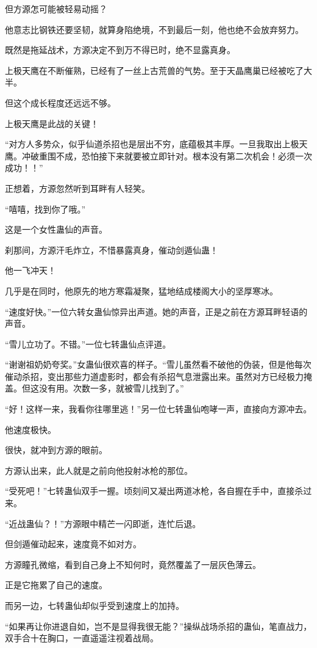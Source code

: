 \begin{this_body}
但方源怎可能被轻易动摇？

他意志比钢铁还要坚韧，就算身陷绝境，不到最后一刻，他也绝不会放弃努力。

既然是拖延战术，方源决定不到万不得已时，绝不显露真身。

上极天鹰在不断催熟，已经有了一丝上古荒兽的气势。至于天晶鹰巢已经被吃了大半。

但这个成长程度还远远不够。

上极天鹰是此战的关键！

“对方人多势众，似乎仙道杀招也是层出不穷，底蕴极其丰厚。一旦我取出上极天鹰。冲破重围不成，恐怕接下来就要被立即针对。根本没有第二次机会！必须一次成功！！”

正想着，方源忽然听到耳畔有人轻笑。

“嘻嘻，找到你了哦。”

这是一个女性蛊仙的声音。

刹那间，方源汗毛炸立，不惜暴露真身，催动剑遁仙蛊！

他一飞冲天！

几乎是在同时，他原先的地方寒霜凝聚，猛地结成楼阁大小的坚厚寒冰。

“速度好快。”一位六转女蛊仙惊异出声道。她的声音，正是之前在方源耳畔轻语的声音。

“雪儿立功了。不错。”一位七转蛊仙点评道。

“谢谢祖奶奶夸奖。”女蛊仙很欢喜的样子。“雪儿虽然看不破他的伪装，但是他每次催动杀招，变出那些力道虚影时，都会有杀招气息泄露出来。虽然对方已经极力掩盖。但这没有用。次数一多，就被雪儿找到了。”

“好！这样一来，我看你往哪里逃！”另一位七转蛊仙咆哮一声，直接向方源冲去。

他速度极快。

很快，就冲到方源的眼前。

方源认出来，此人就是之前向他投射冰枪的那位。

“受死吧！”七转蛊仙双手一握。顷刻间又凝出两道冰枪，各自握在手中，直接杀过来。

“近战蛊仙？！”方源眼中精芒一闪即逝，连忙后退。

但剑遁催动起来，速度竟不如对方。

方源瞳孔微缩，看到自己身上不知何时，竟然覆盖了一层灰色薄云。

正是它拖累了自己的速度。

而另一边，七转蛊仙却似乎受到速度上的加持。

“如果再让你进退自如，岂不是显得我很无能？”操纵战场杀招的蛊仙，笔直战力，双手合十在胸口，一直遥遥注视着战局。


\end{this_body}
